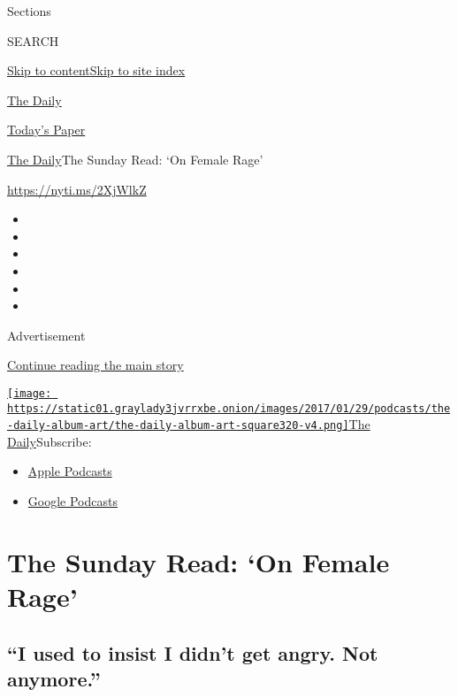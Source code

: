 Sections

SEARCH

\protect\hyperlink{site-content}{Skip to
content}\protect\hyperlink{site-index}{Skip to site index}

\href{https://www.nytimes3xbfgragh.onion/podcasts/the-daily}{The Daily}

\href{https://myaccount.nytimes3xbfgragh.onion/auth/login?response_type=cookie\&client_id=vi}{}

\href{https://www.nytimes3xbfgragh.onion/section/todayspaper}{Today's
Paper}

\href{/podcasts/the-daily}{The Daily}\textbar{}The Sunday Read: `On
Female Rage'

\href{https://nyti.ms/2XjWlkZ}{https://nyti.ms/2XjWlkZ}

\begin{itemize}
\item
\item
\item
\item
\item
\item
\end{itemize}

Advertisement

\protect\hyperlink{after-top}{Continue reading the main story}

\href{https://www.nytimes3xbfgragh.onion/column/the-daily}{\texttt{[image: https://static01.graylady3jvrrxbe.onion/images/2017/01/29/podcasts/the-daily-album-art/the-daily-album-art-square320-v4.png]}The
Daily}Subscribe:

\begin{itemize}
\tightlist
\item
  \href{https://itunes.apple.com/us/podcast/id1200361736}{Apple
  Podcasts}
\item
  \href{https://www.google.com/podcasts?feed=aHR0cHM6Ly9yc3MuYXJ0MTkuY29tL3RoZS1kYWlseQ\%3D\%3D}{Google
  Podcasts}
\end{itemize}

\hypertarget{the-sunday-read-on-female-rage}{%
\section{The Sunday Read: `On Female
Rage'}\label{the-sunday-read-on-female-rage}}

\hypertarget{i-used-to-insist-i-didnt-get-angry-not-anymore}{%
\subsection{``I used to insist I didn't get angry. Not
anymore.''}\label{i-used-to-insist-i-didnt-get-angry-not-anymore}}

